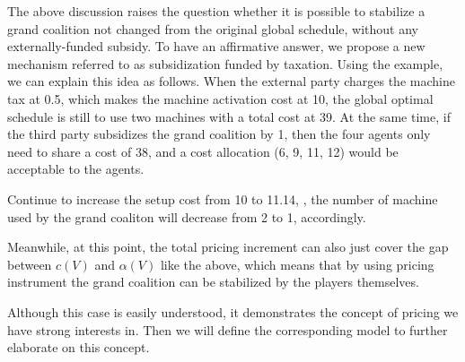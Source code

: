The above discussion raises the question whether it is possible to stabilize a grand coalition not changed from the original global schedule, without any externally-funded subsidy. To have an affirmative answer, we propose a new mechanism referred to as subsidization funded by taxation. Using the example, we can explain this idea as follows. When the external party charges the machine tax at 0.5, which makes the machine activation cost at 10, the global optimal schedule is still to use two machines with a total cost at 39. At the same time, if the third party subsidizes the grand coalition by 1, then the four agents only need to share a cost of 38, and a cost allocation (6, 9, 11, 12) would be acceptable to the agents.

Continue to increase the setup cost from 10 to 11.14, , the number of machine used by the grand coaliton will decrease from 2 to 1, accordingly.

Meanwhile, at this point, the total pricing increment can also just cover the gap between $c(V)$ and $\alpha(V)$ like the above, which means that by using pricing instrument the grand coalition can be stabilized by the players themselves.

Although this case is easily understood, it demonstrates the concept of pricing we have strong interests in. Then we will define the corresponding model to further elaborate on this concept.
